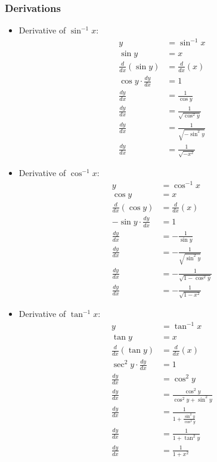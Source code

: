 \documentclass[12pt]{article}
\begin{document}
\subsubsection{Derivations}
\begin{itemize}
	\item Derivative of $\sin^{-1} x$:
	\begin{align*}
		y &= \sin^{-1} x \\
		\sin y &= x \\
		\frac{d}{dx} (\sin y) &= \frac{d}{dx} (x) \\[5pt]
		\cos y \cdot \frac{dy}{dx} &= 1 \\[5pt]
		\frac{dy}{dx} &= \frac{1}{\cos y} \\[5pt]
		\frac{dy}{dx} &= \frac{1}{\sqrt{\cos^2 y}} \\[5pt]
		\frac{dy}{dx} &= \frac{1}{\sqrt{ - \sin^2 y}} \\[5pt]
		\frac{dy}{dx} &= \frac{1}{\sqrt{ - x^2}}
	\end{align*}

	\item Derivative of $\cos^{-1} x$:
	\begin{align*}
		y &= \cos^{-1} x \\
		\cos y &= x \\
		\frac{d}{dx} (\cos y) &= \frac{d}{dx} (x) \\[5pt]
		-\sin y \cdot \frac{dy}{dx} &= 1 \\[5pt]
		\frac{dy}{dx} &= -\frac{1}{\sin y} \\[5pt]
		\frac{dy}{dx} &= -\frac{1}{\sqrt{\sin^2 y}} \\[5pt]
		\frac{dy}{dx} &= -\frac{1}{\sqrt{1 - \cos^2 y}} \\[5pt]
		\frac{dy}{dx} &= -\frac{1}{\sqrt{1 - x^2}}
	\end{align*}

	\item Derivative of $\tan^{-1} x$:
	\begin{align*}
		y &= \tan^{-1} x \\
		\tan y &= x \\
		\frac{d}{dx} (\tan y) &= \frac{d}{dx} (x) \\[5pt]
		\sec^2 y \cdot \frac{dy}{dx} &= 1\\[5pt]
		\frac{dy}{dx} &= \cos^2 y \\[5pt]
		\frac{dy}{dx} &= \frac{\cos^2 y}{\cos^2 y + \sin^2 y} \\[5pt]
		\frac{dy}{dx} &= \frac{1}{1 + \frac{\sin^2 y}{\cos^2 y}} \\[5pt]
		\frac{dy}{dx} &= \frac{1}{1 + \tan^2 y} \\[5pt]
		\frac{dy}{dx} &= \frac{1}{1 + x^2}
	\end{align*}
\end{itemize}
\end{document}
